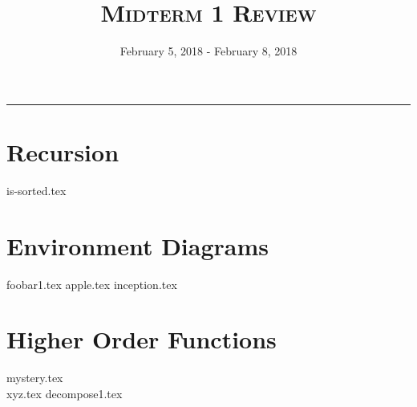 \documentclass{exam}
\title{\textsc{Midterm 1 Review}}
\date{February 5, 2018 - February 8, 2018}
\begin{document}
\maketitle
\rule{\textwidth}{0.15em}
\fontsize{12}{15}\selectfont


\section{Recursion}
\begin{questions}
{is-sorted.tex}
\end{questions}

\newpage
\section{Environment Diagrams}
\begin{questions}
{foobar1.tex}
\newpage
{apple.tex}
\newpage
{inception.tex}

\newpage
\section{Higher Order Functions}
{mystery.tex}
\\[10\baselineskip]
{xyz.tex}
\newpage
{decompose1.tex}
\end{questions}
\end{document}
